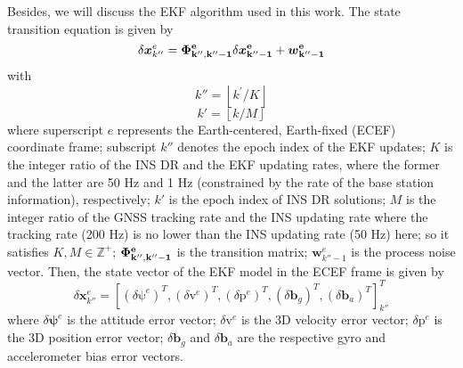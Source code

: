 \documentclass{article}
\begin{document}
Besides, we will discuss the EKF algorithm used in this work. The state transition equation is given by
\[\delta{\boldsymbol{x}}^e_{k''}=\bf{\Phi }^e_{k'',k''-1}\delta{\boldsymbol{x}}^e_{k''-1}+{\boldsymbol{w}}^e_{k''-1}\] 
with
\[k''=\left\lfloor k^{\mathrm{'}}\mathrm{/}K\right\rfloor \] 
\[k'=\left\lfloor k/M\right\rfloor \] 
where superscript $e$ represents the Earth-centered, Earth-fixed (ECEF) coordinate frame; subscript $k''$ denotes the epoch index of the EKF updates; $K$ is the integer ratio of the INS DR and the EKF updating rates, where the former and the latter are 50 Hz and 1 Hz (constrained by the rate of the base station information), respectively; $k'$ is the epoch index of INS DR solutions; $M$ is the integer ratio of the GNSS tracking rate and the INS updating rate where the tracking rate (200 Hz) is no lower than the INS updating rate (50 Hz) here; so it satisfies $K,M\in {\mathbb{Z}}^+$; $\bf{\Phi }^e_{k'',k''-1}$ is the transition matrix; ${\boldsymbol{w}}^e_{k''-1}$ is the process noise vector. Then, the state vector of the EKF model in the ECEF frame is given by 
\[\delta{\boldsymbol{x}}^e_{k''}={\left[{\left(\delta\boldsymbol{\mathrm \psi }^e\right)}^T,{\left(\delta{\boldsymbol{\mathrm {v}}}^e\right)}^T,{\left(\delta{\boldsymbol{\mathrm{p}}}^e\right)}^T,{\left(\delta{\boldsymbol{b}}_g\right)}^T,{\left(\delta{\boldsymbol{b}}_a\right)}^T\right]}^T_{k''}\] 
where $\delta\boldsymbol{\psi }^e$ is the attitude error vector; $\delta{\boldsymbol{\mathrm v}}^e$ is the 3D velocity error vector; $\delta{\boldsymbol{\mathrm p}}^e$ is the 3D position error vector; $\delta{\boldsymbol{b}}_g$ and $\delta{\boldsymbol{b}}_a$ are the respective gyro and accelerometer bias error vectors. 
\end{document}
